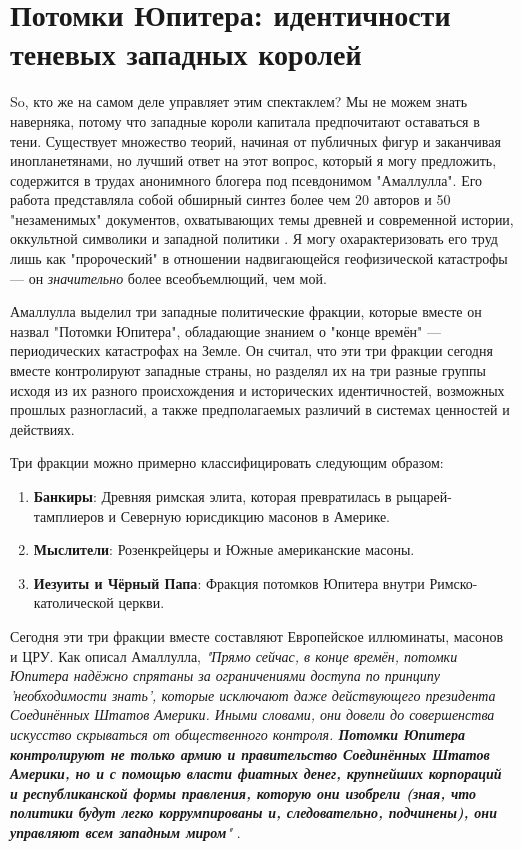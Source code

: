 \documentclass[10pt,twocolumn,letterpaper]{article}
\begin{document}
\section{Потомки Юпитера: идентичности теневых западных королей}

So, кто же на самом деле управляет этим спектаклем? Мы не можем знать наверняка, потому что западные короли капитала предпочитают оставаться в тени. Существует множество теорий, начиная от публичных фигур и заканчивая инопланетянами, но лучший ответ на этот вопрос, который я могу предложить, содержится в трудах анонимного блогера под псевдонимом "Амаллулла". Его работа представляла собой обширный синтез более чем 20 авторов и 50 "незаменимых" документов, охватывающих темы древней и современной истории, оккультной символики и западной политики \cite{33,34}. Я могу охарактеризовать его труд лишь как "пророческий" в отношении надвигающейся геофизической катастрофы — он \textit{значительно} более всеобъемлющий, чем мой.

Амаллулла выделил три западные политические фракции, которые вместе он назвал "Потомки Юпитера", обладающие знанием о "конце времён" — периодических катастрофах на Земле. Он считал, что эти три фракции сегодня вместе контролируют западные страны, но разделял их на три разные группы исходя из их разного происхождения и исторических идентичностей, возможных прошлых разногласий, а также предполагаемых различий в системах ценностей и действиях.

Три фракции можно примерно классифицировать следующим образом:

\begin{flushleft}
\begin{enumerate}
    \item \textbf{Банкиры}: Древняя римская элита, которая превратилась в рыцарей-тамплиеров и Северную юрисдикцию масонов в Америке.
    \item \textbf{Мыслители}: Розенкрейцеры и Южные американские масоны.
    \item \textbf{Иезуиты и Чёрный Папа}: Фракция потомков Юпитера внутри Римско-католической церкви.
\end{enumerate}
\end{flushleft}

Сегодня эти три фракции вместе составляют Европейское иллюминаты, масонов и ЦРУ. Как описал Амаллулла, \textit{"Прямо сейчас, в конце времён, потомки Юпитера надёжно спрятаны за ограничениями доступа по принципу 'необходимости знать', которые исключают даже действующего президента Соединённых Штатов Америки. Иными словами, они довели до совершенства искусство скрываться от общественного контроля. \textbf{Потомки Юпитера контролируют не только армию и правительство Соединённых Штатов Америки, но и с помощью власти фиатных денег, крупнейших корпораций и республиканской формы правления, которую они изобрели (зная, что политики будут легко коррумпированы и, следовательно, подчинены), они управляют всем западным миром}"} \cite{33,34}.
\end{document}

